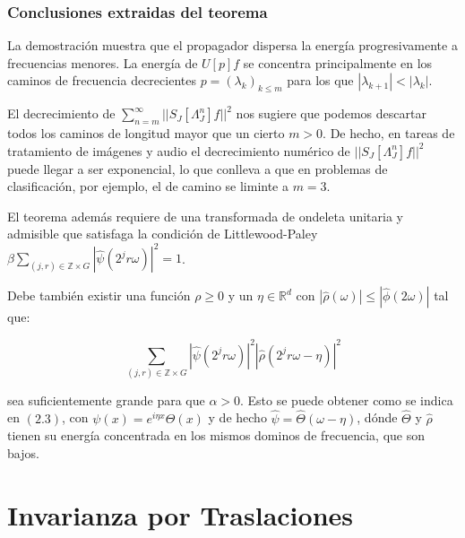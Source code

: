 \subsubsection{Conclusiones extraidas del teorema}
\noindent La demostración muestra que el propagador dispersa la energía progresivamente a frecuencias menores. La energía de $U[p]f$ se concentra principalmente en los caminos de frecuencia decrecientes $p=(\lambda_k)_{k\leq m}$ para los que $|\lambda_{k+1}|<|\lambda_k|$.


\medskip

\noindent El decrecimiento de $\sum_{n=m}^\infty || S_J[\Lambda_J^n]f||^2$ nos sugiere que podemos descartar todos los caminos de longitud mayor que un cierto $m>0$. De hecho, en tareas de tratamiento de imágenes y audio el decrecimiento numérico de $||S_J[\Lambda_J^n]f||^2$ puede llegar a ser exponencial, lo que conlleva a que en problemas de clasificación, por ejemplo, el de camino se liminte a $m=3$.

\medskip

\noindent El teorema además requiere de una transformada de ondeleta unitaria y admisible que satisfaga la condición de Littlewood-Paley $\beta \sum_{(j,r)\in \mathbb{Z}\times G}|\widehat{\psi}(2^jr\omega)|^2=1$. 

\medskip

\noindent Debe también existir una función $\rho \geq 0$ y un $\eta \in \mathbb{R}^d$ con $|\widehat{\rho}(\omega)|\leq |\widehat{\phi}(2\omega)|$ tal que: 

$$\sum_{(j,r)\in\mathbb{Z}\times G}|\widehat{\psi}(2^jr\omega)|^2|\widehat{\rho}(2^jr\omega-\eta)|^2$$

\noindent sea suficientemente grande para que $\alpha>0$. Esto se puede obtener como se indica en $(2.3)$, con $\psi(x)=e^{i\eta x}\Theta(x)$ y de hecho $\widehat{\psi}=\widehat{\Theta}(\omega-\eta)$, dónde $\widehat{\Theta}$ y $\widehat{\rho}$ tienen su energía concentrada en los mismos dominos de frecuencia, que son bajos.

















\section{Invarianza por Traslaciones} \label{ch:seccion14}

